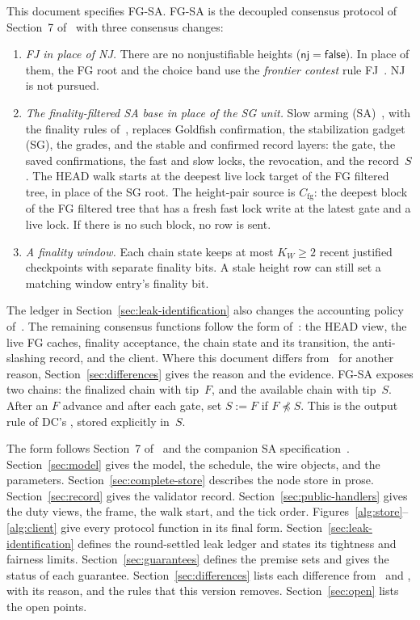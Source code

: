 \documentclass{article}
\theoremstyle{plain}
\theoremstyle{definition}
\theoremstyle{remark}
\newcommand{\nj}{\mathsf{nj}}
\newcommand{\fname}[1]{\text{\textsc{#1}}}
\newcommand{\Cfg}{C_{\mathrm{fg}}}
\newcommand{\DC}[1]{\cite[\S#1]{DC}}
\newcommand{\SAS}{\cite{SAS}}
\newcommand{\FJ}[1]{\cite[\S#1]{FJ}}
\begin{document}
This document specifies FG-SA.  FG-SA is the decoupled consensus
protocol of Section~7 of~\cite{DC} with three consensus changes:
\begin{enumerate}[label=(\alph*),nosep]
\item \emph{FJ in place of NJ.}  There are no nonjustifiable heights
  ($\nj=\mathsf{false}$).  In place of them, the FG root and the choice
  band use the \emph{frontier contest} rule FJ~\FJ{2}.  NJ is not pursued.
\item \emph{The finality-filtered SA base in place of the SG unit.}
  Slow arming (SA)~\SAS{}, with the finality rules of~\cite[\S2]{FB},
  replaces Goldfish confirmation, the stabilization
  gadget (SG), the grades, and the stable and confirmed record layers:
  the gate, the saved confirmations, the fast and slow locks, the revocation,
  and the record~$S$.  The HEAD walk starts at the deepest live lock target
  of the FG filtered tree, in place of the SG root.  The height-pair
  source is $\Cfg$: the deepest block of the FG filtered tree that has a
  fresh fast lock write at the latest gate and a live lock.  If there
  is no such block, no row is sent.
\item \emph{A finality window.}  Each chain state keeps at most $K_W\geq2$
  recent justified checkpoints with separate finality bits.  A stale
  height row can still set a matching window entry's finality bit.
\end{enumerate}
The ledger in Section~\ref{sec:leak-identification} also changes the
accounting policy of~\DC{8}.  The remaining consensus functions follow
the form of~\DC{7}: the HEAD view, the live FG
caches, finality acceptance, the chain state and its transition, the
anti-slashing record, and the client.  Where this document differs
from~\DC{7} for another reason, Section~\ref{sec:differences} gives the
reason and the evidence.  FG-SA exposes two chains: the finalized chain
with tip~$F$, and the available chain with tip~$S$.  After an $F$
advance and after each gate, set $S:=F$ if $F\not\preceq S$.  This is
the output rule of DC's \fname{get\_stable}, stored explicitly in~$S$.

The form follows Section~7 of~\cite{DC} and the companion SA
specification~\SAS.  Section~\ref{sec:model} gives the model, the
schedule, the wire objects, and the parameters.
Section~\ref{sec:complete-store} describes the node store in prose.
Section~\ref{sec:record} gives the validator record.
Section~\ref{sec:public-handlers} gives the duty views, the frame, the
walk start, and the tick order.  Figures~\ref{alg:store}--\ref{alg:client}
give every protocol function in its final form.
Section~\ref{sec:leak-identification} defines the round-settled leak
ledger and states its tightness and fairness limits.
Section~\ref{sec:guarantees} defines the premise sets and gives the
status of each guarantee.
Section~\ref{sec:differences} lists each difference from~\DC{7} and
\DC{8}, with
its reason, and the rules that this version removes.
Section~\ref{sec:open} lists the open points.
\end{document}
